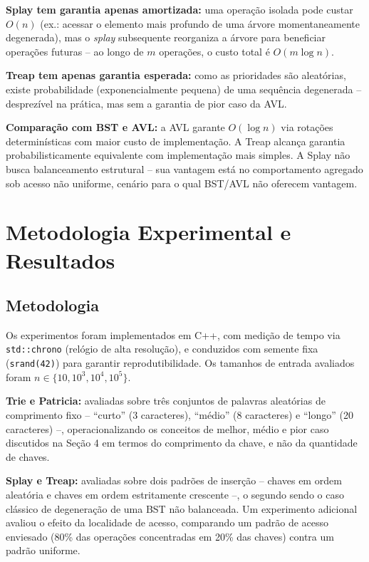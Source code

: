 \documentclass[11pt]{article}
\begin{document}
\textbf{Splay tem garantia apenas amortizada:} uma operação isolada pode
custar $O(n)$ (ex.: acessar o elemento mais profundo de uma árvore
momentaneamente degenerada), mas o \textit{splay} subsequente reorganiza a
árvore para beneficiar operações futuras -- ao longo de $m$ operações, o
custo total é $O(m \log n)$.

\textbf{Treap tem apenas garantia esperada:} como as prioridades são
aleatórias, existe probabilidade (exponencialmente pequena) de uma sequência
degenerada -- desprezível na prática, mas sem a garantia de pior caso da AVL.

\textbf{Comparação com BST e AVL:} a AVL garante $O(\log n)$ via rotações
determinísticas com maior custo de implementação. A Treap alcança garantia
probabilisticamente equivalente com implementação mais simples. A Splay não
busca balanceamento estrutural -- sua vantagem está no comportamento agregado
sob acesso não uniforme, cenário para o qual BST/AVL não oferecem vantagem.

\section{Metodologia Experimental e Resultados}

\subsection{Metodologia}

Os experimentos foram implementados em C++, com medição de tempo via
\texttt{std::chrono} (relógio de alta resolução), e conduzidos com semente
fixa (\texttt{srand(42)}) para garantir reprodutibilidade. Os tamanhos de
entrada avaliados foram $n \in \{10, 10^3, 10^4, 10^5\}$.

\textbf{Trie e Patricia:} avaliadas sobre três conjuntos de palavras aleatórias
de comprimento fixo -- ``curto'' (3 caracteres), ``médio'' (8 caracteres) e
``longo'' (20 caracteres) --, operacionalizando os conceitos de melhor, médio e
pior caso discutidos na Seção 4 em termos do comprimento da chave, e não da
quantidade de chaves.

\textbf{Splay e Treap:} avaliadas sobre dois padrões de inserção -- chaves em
ordem aleatória e chaves em ordem estritamente crescente --, o segundo sendo o
caso clássico de degeneração de uma BST não balanceada. Um experimento
adicional avaliou o efeito da localidade de acesso, comparando um padrão de
acesso enviesado (80\% das operações concentradas em 20\% das chaves) contra um
padrão uniforme.
\end{document}

